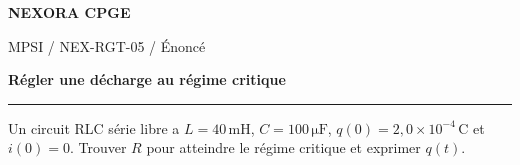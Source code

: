 \documentclass[11pt,a4paper]{article}
\begin{document}
{\small\bfseries\color{nexorablue} NEXORA CPGE}\par
{\small MPSI / NEX-RGT-05 / Énoncé}\par
{\LARGE\bfseries Régler une décharge au régime critique}\par
\vspace{0.25em}\hrule\vspace{0.6em}

Un circuit RLC série libre a $L=40\,\mathrm{mH}$, $C=100\,\mathrm{\mu F}$, $q(0)=2{,}0\times10^{-4}\,\mathrm C$ et $i(0)=0$. Trouver $R$ pour atteindre le régime critique et exprimer $q(t)$.
\end{document}
